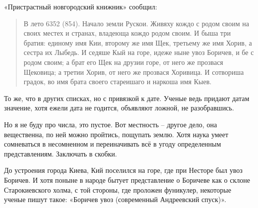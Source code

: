 «Пристрастный новгородский книжник» сообщил:

\begin{quotation}
В лето 6352 (854). Начало земли Рускои. Живяху кождо с родом своим на своих местех и странах, владеюща кождо родом своим. И быша три братия: единому имя Кии, второму же имя Щек, третьему же имя Хорив, а сестра их Лыбедь. И седяше Кый на горе, идеже ныне увоз Боричев, и бе с родом своим; а брат его Щек на друзии горе, от него же прозвася Щековица; а третии Хорив, от него же прозвася Хоривица. И сотвориша градок, во имя брата своего стареишаго и наркоша имя Кыев.
\end{quotation}

То же, что в других списках, но с привязкой к дате. Ученые ведь придают датам значение, хотя ежели дата не годится, объявляют ложной, не разобравшись.

Но я не буду про числа, это пустое. Вот местность – другое дело, она вещественна, по ней можно пройтись, пощупать землю. Хотя наука умеет сомневаться в несомненном и переиначивать всё в угоду определенным представлениям. Заключать в скобки.

До устроения города Киева, Кий поселился на горе, где при Несторе был увоз Боричев. И хотя поныне в народе бытует представление о Боричеве как о склоне Старокиевского холма, с той стороны, где проложен фуникулер, некоторые ученые пишут такое: «Боричев увоз (современный Андреевский спуск)».
